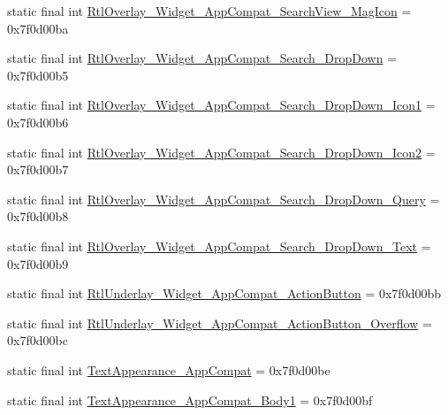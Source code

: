 \begin{DoxyCompactItemize}
static final int \mbox{\hyperlink{classandroid_1_1support_1_1v7_1_1appcompat_1_1_r_1_1style_af86deaaeed3a6ce46e3164ddfecf1dc4}{Rtl\+Overlay\+\_\+\+Widget\+\_\+\+App\+Compat\+\_\+\+Search\+View\+\_\+\+Mag\+Icon}} = 0x7f0d00ba
\item 
static final int \mbox{\hyperlink{classandroid_1_1support_1_1v7_1_1appcompat_1_1_r_1_1style_a5e5fdfffdb11d965c660ba127baa6384}{Rtl\+Overlay\+\_\+\+Widget\+\_\+\+App\+Compat\+\_\+\+Search\+\_\+\+Drop\+Down}} = 0x7f0d00b5
\item 
static final int \mbox{\hyperlink{classandroid_1_1support_1_1v7_1_1appcompat_1_1_r_1_1style_ab2fa2b3005166cd16d6868de78bf4747}{Rtl\+Overlay\+\_\+\+Widget\+\_\+\+App\+Compat\+\_\+\+Search\+\_\+\+Drop\+Down\+\_\+\+Icon1}} = 0x7f0d00b6
\item 
static final int \mbox{\hyperlink{classandroid_1_1support_1_1v7_1_1appcompat_1_1_r_1_1style_ac0d2345330dd831f232f53ea121e66be}{Rtl\+Overlay\+\_\+\+Widget\+\_\+\+App\+Compat\+\_\+\+Search\+\_\+\+Drop\+Down\+\_\+\+Icon2}} = 0x7f0d00b7
\item 
static final int \mbox{\hyperlink{classandroid_1_1support_1_1v7_1_1appcompat_1_1_r_1_1style_abaa10d6dd2e8d619861a432668532862}{Rtl\+Overlay\+\_\+\+Widget\+\_\+\+App\+Compat\+\_\+\+Search\+\_\+\+Drop\+Down\+\_\+\+Query}} = 0x7f0d00b8
\item 
static final int \mbox{\hyperlink{classandroid_1_1support_1_1v7_1_1appcompat_1_1_r_1_1style_a57c7183cd74f896000a7edc8600208d0}{Rtl\+Overlay\+\_\+\+Widget\+\_\+\+App\+Compat\+\_\+\+Search\+\_\+\+Drop\+Down\+\_\+\+Text}} = 0x7f0d00b9
\item 
static final int \mbox{\hyperlink{classandroid_1_1support_1_1v7_1_1appcompat_1_1_r_1_1style_ace2f5725c7ad367707fd108f93a35fa0}{Rtl\+Underlay\+\_\+\+Widget\+\_\+\+App\+Compat\+\_\+\+Action\+Button}} = 0x7f0d00bb
\item 
static final int \mbox{\hyperlink{classandroid_1_1support_1_1v7_1_1appcompat_1_1_r_1_1style_a32b360b3a3dbd458e27c881a1b51856e}{Rtl\+Underlay\+\_\+\+Widget\+\_\+\+App\+Compat\+\_\+\+Action\+Button\+\_\+\+Overflow}} = 0x7f0d00bc
\item 
static final int \mbox{\hyperlink{classandroid_1_1support_1_1v7_1_1appcompat_1_1_r_1_1style_a42b9227b2e55ee8feb8221dd6d1f3ec4}{Text\+Appearance\+\_\+\+App\+Compat}} = 0x7f0d00be
\item 
static final int \mbox{\hyperlink{classandroid_1_1support_1_1v7_1_1appcompat_1_1_r_1_1style_a00c54a311c223f13abcddcd7ecffc64c}{Text\+Appearance\+\_\+\+App\+Compat\+\_\+\+Body1}} = 0x7f0d00bf

\end{DoxyCompactItemize}
